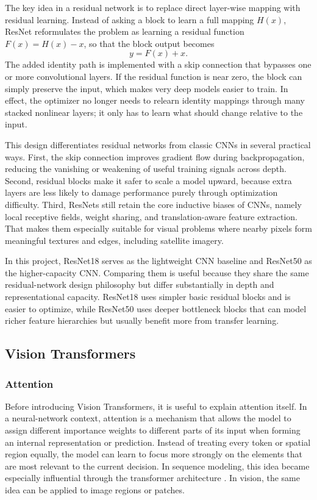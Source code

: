 \documentclass[11pt]{report}
\begin{document}
The key idea in a residual network is to replace direct layer-wise mapping with residual learning. Instead of asking a block to learn a full mapping \(H(x)\), ResNet reformulates the problem as learning a residual function \(F(x) = H(x) - x\), so that the block output becomes
\[
y = F(x) + x.
\]
The added identity path is implemented with a skip connection that bypasses one or more convolutional layers. If the residual function is near zero, the block can simply preserve the input, which makes very deep models easier to train. In effect, the optimizer no longer needs to relearn identity mappings through many stacked nonlinear layers; it only has to learn what should change relative to the input.

This design differentiates residual networks from classic CNNs in several practical ways. First, the skip connection improves gradient flow during backpropagation, reducing the vanishing or weakening of useful training signals across depth. Second, residual blocks make it safer to scale a model upward, because extra layers are less likely to damage performance purely through optimization difficulty. Third, ResNets still retain the core inductive biases of CNNs, namely local receptive fields, weight sharing, and translation-aware feature extraction. That makes them especially suitable for visual problems where nearby pixels form meaningful textures and edges, including satellite imagery.

In this project, ResNet18 serves as the lightweight CNN baseline and ResNet50 as the higher-capacity CNN. Comparing them is useful because they share the same residual-network design philosophy but differ substantially in depth and representational capacity. ResNet18 uses simpler basic residual blocks and is easier to optimize, while ResNet50 uses deeper bottleneck blocks that can model richer feature hierarchies but usually benefit more from transfer learning.

\subsection{Vision Transformers}
\subsubsection{Attention}
Before introducing Vision Transformers, it is useful to explain attention itself. In a neural-network context, attention is a mechanism that allows the model to assign different importance weights to different parts of its input when forming an internal representation or prediction. Instead of treating every token or spatial region equally, the model can learn to focus more strongly on the elements that are most relevant to the current decision. In sequence modeling, this idea became especially influential through the transformer architecture \cite{vaswani2017}. In vision, the same idea can be applied to image regions or patches.
\end{document}
